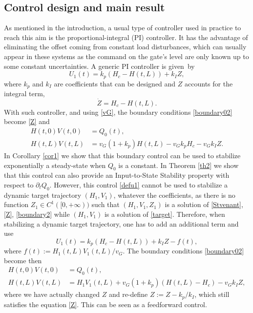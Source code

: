 \documentclass[JEP,XML,SOM,Unicode]{cedram}
\theoremstyle{definition}
\begin{document}
\subsection{Control design and main result}
As mentioned in the introduction, a usual type of controller used in practice to reach this aim is the proportional-integral (PI) controller.
It has the advantage of eliminating the offset coming from constant load disturbances, which can usually appear in these systems
as the command on the gate's level are only known up to some constant uncertainties.
A generic PI controller is given~by
\begin{equation}
U_{1}(t)=k_{p}(H_{c}-H(t,L))+k_{I}Z,
\label{defu1}
\end{equation}
where $k_{p}$ and $k_{I}$ are coefficients that can be designed and $Z$ accounts for the integral term, \ie
\begin{equation}
\dot Z=H_{c}-H(t,L).
\label{Z}
\end{equation}
With such controller, and using \eqref{vG}, the boundary conditions \eqref{boundary02} become {\eqref{Z} and}
\begin{equation}
\label{boundary2}
\begin{split}
H(t,0)V(t,0)&=Q_{0}(t),\\
H(t,L)V(t,L)&=v_{G}(1+k_{p})H(t,L)-v_{G}k_{p}H_{c}-v_{G}k_{I}Z.
\end{split}
\end{equation}
In Corollary \ref{cor1} we show that this boundary control can be used to stabilize {exponentially} a steady-state when $Q_{0}$ is a constant.
In Theorem \ref{th2} we show that this control can also provide an Input-to-State Stability property with respect to $\partial_{t}Q_{0}$.
However, this control \eqref{defu1} cannot be used to stabilize {a} dynamic target trajectory $(H_{1},V_{1})$, {whatever the coefficients,} as there is no function $Z_{1}\in C^{1}([0,+\infty))$ such that $(H_{1},V_{1},Z_{1})$
is a solution of \eqref{Stvenant}, \eqref{Z}, \eqref{boundary2} while $(H_{1},V_{1})$ is a solution of \eqref{target}. Therefore, when stabilizing a dynamic target trajectory, one has to add an additional term and use
\begin{equation}
U_{1}(t)=k_{p}(H_{c}-H(t,L))+k_{I}Z-f(t),
\label{defu12}
\end{equation}
where $f(t):=H_{1}(t,L)V_{1}(t,L)/v_{G}$. The boundary conditions \eqref{boundary02} become then
\begin{equation}
\begin{split}
H(t,0)V(t,0)&=Q_{0}(t),\\
H(t,L)V(t,L)&=H_{1}V_{1}(t,L)+v_{G}(1+k_{p})(H(t,L)-H_{c})-v_{G}k_{I}Z,
\label{boundary1}
\end{split}
\end{equation}
where we have actually changed $Z$ and re-define $Z:=Z-k_{p}/k_{I}$, which still satisfies the equation \eqref{Z}. {This can be seen as a feedforward control.}
\end{document}
